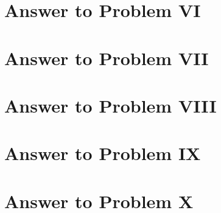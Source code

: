 \documentclass[11pt,a4paper]{article}
\begin{document}
\section{Answer to Problem VI}\label{sec:P06}



\clearpage
\section{Answer to Problem VII}\label{sec:P07}



\clearpage
\section{Answer to Problem VIII}\label{sec:P08}



\clearpage
\section{Answer to Problem IX}\label{sec:P09}



\clearpage
\section{Answer to Problem X}\label{sec:P10}



\clearpage

\printbibliography

\end{document}
